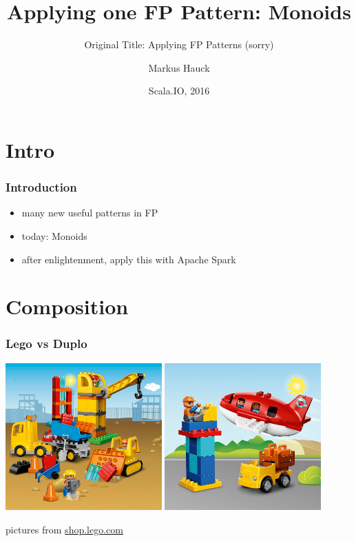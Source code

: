 \documentclass{beamer}
\title{Applying \textbf{one} FP Pattern: Monoids}
\subtitle{Original Title: Applying FP Patterns (sorry)}
\author{Markus Hauck}
\date{Scala.IO, 2016}
\begin{document}
\frame{\titlepage}

\section{Intro}
\label{sec:intro}

\begin{frame}
  \frametitle{Introduction}
  \begin{itemize}
  \item many new useful patterns in FP
  \item today: Monoids
  \item after enlightenment, apply this with Apache Spark
  \end{itemize}
\end{frame}

\section{Composition}

\begin{frame}
  \frametitle{Lego vs Duplo}
  \begin{center}
    \includegraphics[width=0.45\textwidth]{../images/duplo-construction.jpg}
    \hspace{1mm}
    \includegraphics[width=0.45\textwidth]{../images/duplo-airport.jpg}
  \end{center}
  \vfill
  \begin{center}
    {\tiny pictures from \url{shop.lego.com}}
  \end{center}
\end{frame}
\end{document}
